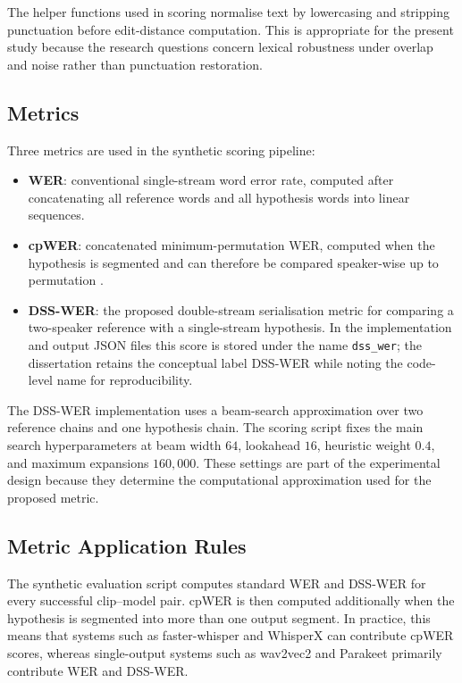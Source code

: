 The helper functions used in scoring normalise text by lowercasing and stripping punctuation before edit-distance computation. This is appropriate for the present study because the research questions concern lexical robustness under overlap and noise rather than punctuation restoration.

\subsection{Metrics}
Three metrics are used in the synthetic scoring pipeline:
\begin{itemize}
    \item \textbf{WER}: conventional single-stream word error rate, computed after concatenating all reference words and all hypothesis words into linear sequences.
    \item \textbf{cpWER}: concatenated minimum-permutation WER, computed when the hypothesis is segmented and can therefore be compared speaker-wise up to permutation \citep{Word_Error_Rate_Definitions}.
    \item \textbf{DSS-WER}: the proposed double-stream serialisation metric for comparing a two-speaker reference with a single-stream hypothesis. In the implementation and output JSON files this score is stored under the name \texttt{dss\_wer}; the dissertation retains the conceptual label DSS-WER while noting the code-level name for reproducibility.
\end{itemize}

The DSS-WER implementation uses a beam-search approximation over two reference chains and one hypothesis chain. The scoring script fixes the main search hyperparameters at beam width \(64\), lookahead \(16\), heuristic weight \(0.4\), and maximum expansions \(160{,}000\). These settings are part of the experimental design because they determine the computational approximation used for the proposed metric.

\subsection{Metric Application Rules}
The synthetic evaluation script computes standard WER and DSS-WER for every successful clip--model pair. cpWER is then computed additionally when the hypothesis is segmented into more than one output segment. In practice, this means that systems such as faster-whisper and WhisperX can contribute cpWER scores, whereas single-output systems such as wav2vec2 and Parakeet primarily contribute WER and DSS-WER.

